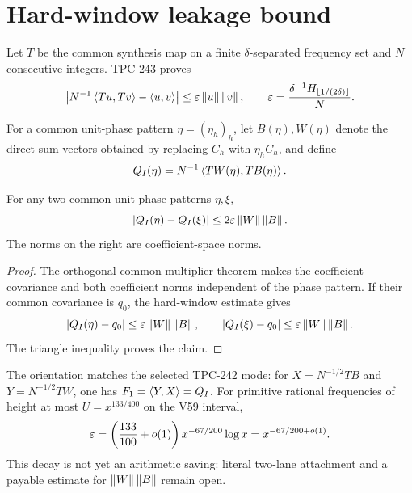 \section{Hard-window leakage bound}

Let $T$ be the common synthesis map on a finite $\delta$-separated frequency
set and $N$ consecutive integers.  TPC-243 proves
\[
\left|N^{-1}\left\langle Tu,Tv\right\rangle-\left\langle u,v\right\rangle\right|
\leq\varepsilon\left\lVert u\right\rVert\left\lVert v\right\rVert,
\qquad
\varepsilon=\frac{\delta^{-1}H_{\lfloor1/(2\delta)\rfloor}}{N}.
\]

For a common unit-phase pattern $\eta=(\eta_h)_h$, let $B(\eta),W(\eta)$
denote the direct-sum vectors obtained by replacing $C_h$ with
$\eta_hC_h$, and define
\[
Q_I(\eta)=N^{-1}\left\langle TW(\eta),TB(\eta)\right\rangle.
\]

\begin{corollary}
For any two common unit-phase patterns $\eta,\xi$,
\[
|Q_I(\eta)-Q_I(\xi)|
\leq2\varepsilon\left\lVert W\right\rVert\left\lVert B\right\rVert.
\]
The norms on the right are coefficient-space norms.
\end{corollary}

\begin{proof}
The orthogonal common-multiplier theorem makes the coefficient covariance and
both coefficient norms independent of the phase pattern.  If their common
covariance is $q_0$, the hard-window estimate gives
\[
|Q_I(\eta)-q_0|\leq\varepsilon\left\lVert W\right\rVert\left\lVert B\right\rVert,
\qquad
|Q_I(\xi)-q_0|\leq\varepsilon\left\lVert W\right\rVert\left\lVert B\right\rVert.
\]
The triangle inequality proves the claim.
\end{proof}

The orientation matches the selected TPC-242 mode: for
$X=N^{-1/2}TB$ and $Y=N^{-1/2}TW$, one has
$F_1=\left\langle Y,X\right\rangle=Q_I$.  For primitive rational frequencies of height at most
$U=x^{133/400}$ on the V59 interval,
\[
\varepsilon=\left(\frac{133}{100}+o(1)\right)
x^{-67/200}\log x=x^{-67/200+o(1)}.
\]
\EndAccSupp{}
This decay is not yet an arithmetic saving: literal two-lane attachment and a
payable estimate for $\left\lVert W\right\rVert\left\lVert B\right\rVert$ remain open.
